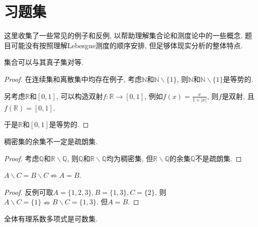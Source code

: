 \documentclass[theorem=false,mathfont=none,openany,sub3section]{easybook}
\begin{document}
\newpage

\chapter{习题集}

\begin{remark}
  这里收集了一些常见的例子和反例, 以帮助理解集合论和测度论中的一些概念. 题目可能没有按照理解Lebesgue测度的顺序安排, 但足够体现实分析的整体特点.\par
\end{remark}

\begin{example}
  集合可以与其真子集对等.
\end{example}

\begin{proof}
  在连续集和离散集中均存在例子, 考虑$\mathbb{N}$和$\mathbb{N}\backslash \{1\}$, 则$\mathbb{N}$和$\mathbb{N}\backslash \{1\}$是等势的.\par
  另考虑$\mathbb{R}$和$[0,1]$, 可以构造双射$f:\mathbb{R}\rightarrow [0,1]$, 例如$f(x)=\frac{x}{1+|x|}$, 则$f$是双射, 且$f(\mathbb{R})=[0,1]$.\par
  于是$\mathbb{R}$和$[0,1]$是等势的.\par
\end{proof}

\begin{example}
  稠密集的余集不一定是疏朗集.
\end{example}

\begin{proof}
  考虑$\mathbb{Q}$和$\mathbb{R}\backslash \mathbb{Q}$, 则$\mathbb{Q}$和$\mathbb{R}\backslash \mathbb{Q}$均为稠密集, 但$\mathbb{R}\backslash \mathbb{Q}$的余集$\mathbb{Q}$不是疏朗集.\par
\end{proof}

\begin{example}
  $A \backslash C =  B \backslash C \nRightarrow A = B$.
\end{example}

\begin{proof}
  反例可取$A=\{1,2,3\}, B=\{1,3\}, C=\{2\}$, 则$A \backslash C = \{1\} \nRightarrow B \backslash C = \{1,3\}$. 但$A=B$.\par
\end{proof}

\begin{example}
  全体有理系数多项式是可数集.
\end{example}
\end{document}
